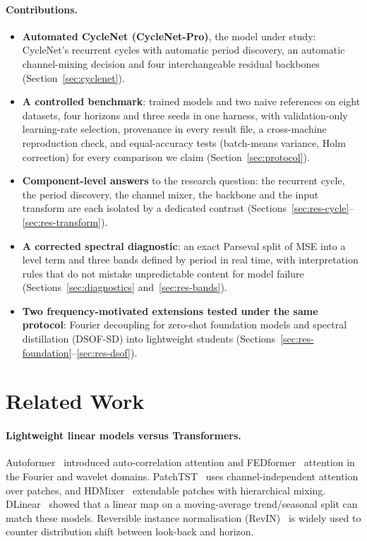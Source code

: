 \documentclass[11pt,a4paper]{article}
\begin{document}
\paragraph{Contributions.}
\begin{itemize}
    \item \textbf{Automated CycleNet (CycleNet-Pro)}, the model under study: CycleNet's recurrent cycles with automatic period discovery, an automatic channel-mixing decision and four interchangeable residual backbones (Section~\ref{sec:cyclenet}).
    \item \textbf{A controlled benchmark}: \vNumTrainedModels{} trained models and two naive references on eight datasets, four horizons and three seeds in one harness, with validation-only learning-rate selection, provenance in every result file, a cross-machine reproduction check, and equal-accuracy tests (batch-means variance, Holm correction) for every comparison we claim (Section~\ref{sec:protocol}).
    \item \textbf{Component-level answers} to the research question: the recurrent cycle, the period discovery, the channel mixer, the backbone and the input transform are each isolated by a dedicated contrast (Sections~\ref{sec:res-cycle}--\ref{sec:res-transform}).
    \item \textbf{A corrected spectral diagnostic}: an exact Parseval split of MSE into a level term and three bands defined by period in real time, with interpretation rules that do not mistake unpredictable content for model failure (Sections~\ref{sec:diagnostics} and~\ref{sec:res-bands}).
    \item \textbf{Two frequency-motivated extensions tested under the same protocol}: Fourier decoupling for zero-shot foundation models and spectral distillation (DSOF-SD) into lightweight students (Sections~\ref{sec:res-foundation}--\ref{sec:res-dsof}).
\end{itemize}

\section{Related Work}
\label{sec:related_work}

\paragraph{Lightweight linear models versus Transformers.}
Autoformer~\cite{wu2021autoformer} introduced auto-correlation attention and FEDformer~\cite{zhou2022fedformer} attention in the Fourier and wavelet domains. PatchTST~\cite{nie2023patchtst} uses channel-independent attention over patches, and HDMixer~\cite{hdmixer2024} extendable patches with hierarchical mixing. DLinear~\cite{zeng2023dlinear} showed that a linear map on a moving-average trend/seasonal split can match these models. Reversible instance normalisation (RevIN)~\cite{kim2021revin} is widely used to counter distribution shift between look-back and horizon.
\end{document}
